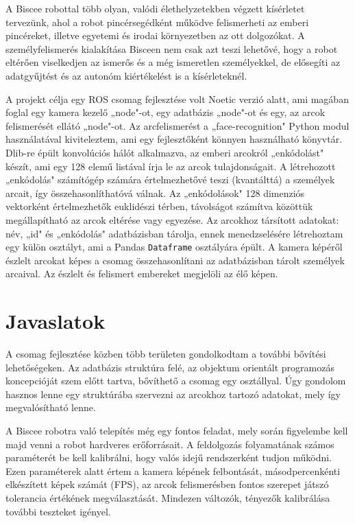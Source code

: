 A Biscee robottal több olyan, valódi élethelyzetekben végzett kísérletet tervezünk, ahol a robot pincérsegédként működve felismerheti az emberi pincéreket, illetve egyetemi és irodai környezetben az ott dolgozókat. A személyfelismerés kialakítása Bisceen nem csak azt teszi lehetővé, hogy a robot eltérően viselkedjen az ismerős és a még ismeretlen személyekkel, de elősegíti az adatgyűjtést és az autonóm kiértékelést is a kísérleteknél.

A projekt célja egy ROS csomag fejlesztése volt Noetic verzió alatt, ami magában foglal egy
kamera kezelő „node"-ot, egy adatbázis „node"-ot és egy, az arcok felismerését ellátó „node"-ot. Az arcfelismerést a „face-recognition" Python modul használatával kiviteleztem, ami egy fejlesztőként könnyen használható könyvtár. Dlib-re épült konvolúciós hálót alkalmazva, az emberi arcokról „enkódolást" készít, ami egy 128 elemű listával írja le az arcok tulajdonságait. A létrehozott „enkódolás" számítógép számára értelmezhetővé teszi (kvantálttá) a személyek arcait, így összehasonlíthatóvá válnak. Az „enkódolások" 128 dimenziós vektorként értelmezhetők euklidészi térben, távolságot számítva közöttük megállapítható az arcok eltérése vagy egyezése. Az arcokhoz társított adatokat: név, „id" és „enkódolás" adatbázisban tárolja, ennek menedzselésére létrehoztam egy külön osztályt, ami a Pandas \verb|Dataframe| osztályára épült. A kamera képéről észlelt arcokat képes a csomag összehasonlítani az adatbázisban tárolt személyek arcaival. Az észlelt és felismert embereket megjelöli az élő képen. 

\section{Javaslatok} %
A csomag fejlesztése közben több területen gondolkodtam a további bővítési lehetőségeken. Az adatbázis struktúra felé, az objektum orientált programozás koncepcióját szem előtt tartva, bővíthető a csomag egy osztállyal. Úgy gondolom hasznos lenne egy struktúrába szervezni az arcokhoz tartozó adatokat, mely így megvalósítható lenne.

A Biscee robotra való telepítés még egy fontos feladat, mely során figyelembe kell majd venni a robot hardveres erőforrásait. A feldolgozás folyamatának számos paraméterét be kell kalibrálni, hogy valós idejű rendszerként tudjon működni. Ezen paraméterek alatt értem a kamera képének felbontását, másodpercenkénti elkészített képek számát (FPS), az arcok felismerésben fontos szerepet játszó tolerancia értékének megválasztását. Mindezen változók, tényezők kalibrálása további teszteket igényel.

